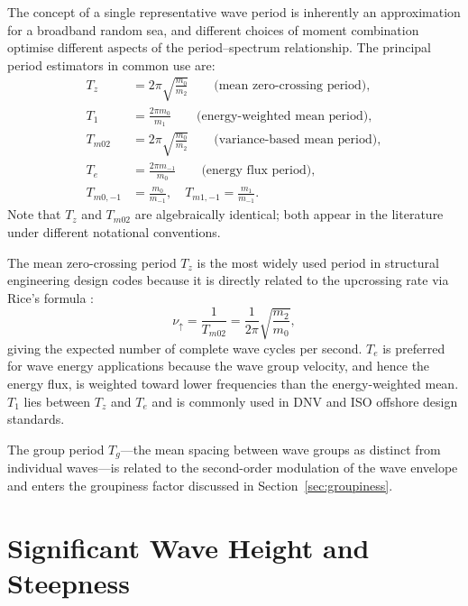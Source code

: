 \documentclass[journal]{IEEEtran}
\begin{document}
    The concept of a single representative wave period is inherently an
    approximation for a broadband random sea, and different choices of
    moment combination optimise different aspects of the period--spectrum
    relationship.
    The principal period estimators in common use are:
    \begin{align}
        T_z &= 2\pi\sqrt{\frac{m_0}{m_2}}
        \qquad\text{(mean zero-crossing period)},
        \label{eq:Tz}\\
        T_1 &= \frac{2\pi m_0}{m_1}
        \qquad\text{(energy-weighted mean period)},
        \label{eq:T1}\\
        T_{m02} &= 2\pi\sqrt{\frac{m_0}{m_2}}
        \qquad\text{(variance-based mean period)},
        \label{eq:Tm02}\\
        T_e &= \frac{2\pi m_{-1}}{m_0}
        \qquad\text{(energy flux period)},
        \label{eq:Te}\\
        T_{m0,-1} &= \frac{m_0}{m_{-1}},
        \quad
        T_{m1,-1} = \frac{m_1}{m_{-1}}.
        \label{eq:Tm01}
    \end{align}
    Note that $T_z$ and $T_{m02}$ are algebraically identical; both
    appear in the literature under different notational conventions.

    The mean zero-crossing period $T_z$ is the most widely used period
    in structural engineering design codes because it is directly related
    to the upcrossing rate via Rice's formula \cite{Rice1944}:
    \begin{equation}
        \nu_\uparrow = \frac{1}{T_{m02}} = \frac{1}{2\pi}\sqrt{\frac{m_2}{m_0}},
        \label{eq:upcrossing}
    \end{equation}
    giving the expected number of complete wave cycles per second.
    $T_e$ is preferred for wave energy applications because the wave group
    velocity, and hence the energy flux, is weighted toward lower frequencies
    than the energy-weighted mean.
    $T_1$ lies between $T_z$ and $T_e$ and is commonly used in DNV and
    ISO offshore design standards.

    The group period $T_g$---the mean spacing between wave groups as
    distinct from individual waves---is related to the second-order
    modulation of the wave envelope and enters the groupiness factor
    discussed in Section~\ref{sec:groupiness}.

    \section{Significant Wave Height and Steepness}
    \label{sec:heights}
\end{document}
